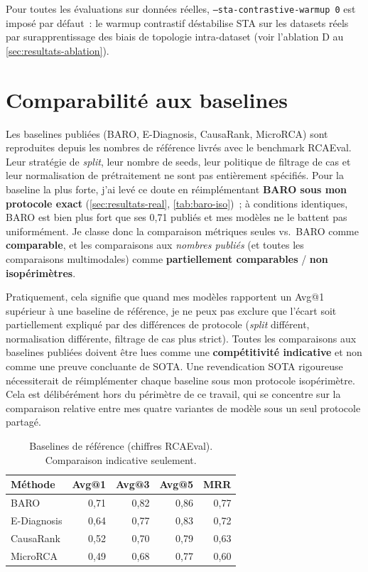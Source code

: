 \documentclass[a4paper,11pt,oneside]{report}
\begin{document}
Pour toutes les \'evaluations sur donn\'ees r\'eelles, \texttt{--sta-contrastive-warmup 0} est impos\'e par d\'efaut~: le warmup contrastif d\'estabilise STA sur les datasets r\'eels par surapprentissage des biais de topologie intra-dataset (voir l'ablation D au \cref{sec:resultats-ablation}).

\section{Comparabilit\'e aux baselines}
\label{sec:comparabilite}

Les baselines publi\'ees (BARO, E-Diagnosis, CausaRank, MicroRCA) sont reproduites depuis les nombres de r\'ef\'erence livr\'es avec le benchmark RCAEval. Leur strat\'egie de \emph{split}, leur nombre de seeds, leur politique de filtrage de cas et leur normalisation de pr\'etraitement ne sont pas enti\`erement sp\'ecifi\'es. Pour la baseline la plus forte, j'ai lev\'e ce doute en r\'eimpl\'ementant \textbf{BARO sous mon protocole exact} (\cref{sec:resultats-real}, \cref{tab:baro-iso})~; \`a conditions identiques, BARO est bien plus fort que ses 0,71 publi\'es et mes mod\`eles ne le battent pas uniform\'ement. Je classe donc la comparaison m\'etriques seules vs.\ BARO comme \textbf{comparable}, et les comparaisons aux \emph{nombres publi\'es} (et toutes les comparaisons multimodales) comme \textbf{partiellement comparables} / \textbf{non isop\'erim\`etres}.

Pratiquement, cela signifie que quand mes mod\`eles rapportent un Avg@1 sup\'erieur \`a une baseline de r\'ef\'erence, je ne peux pas exclure que l'\'ecart soit partiellement expliqu\'e par des diff\'erences de protocole (\emph{split} diff\'erent, normalisation diff\'erente, filtrage de cas plus strict). Toutes les comparaisons aux baselines publi\'ees doivent \^etre lues comme une \textbf{comp\'etitivit\'e indicative} et non comme une preuve concluante de SOTA. Une revendication SOTA rigoureuse n\'ecessiterait de r\'eimpl\'ementer chaque baseline sous mon protocole isop\'erim\`etre. Cela est d\'elib\'er\'ement hors du p\'erim\`etre de ce travail, qui se concentre sur la comparaison relative entre mes quatre variantes de mod\`ele sous un seul protocole partag\'e.

\begin{table}[ht]
\centering
\caption{Baselines de r\'ef\'erence (chiffres RCAEval). Comparaison indicative seulement.}
\label{tab:baselines-ref}
\begin{tabular}{lrrrr}
\toprule
M\'ethode & Avg@1 & Avg@3 & Avg@5 & MRR \\
\midrule
BARO & 0,71 & 0,82 & 0,86 & 0,77 \\
E-Diagnosis & 0,64 & 0,77 & 0,83 & 0,72 \\
CausaRank & 0,52 & 0,70 & 0,79 & 0,63 \\
MicroRCA & 0,49 & 0,68 & 0,77 & 0,60 \\
\bottomrule
\end{tabular}
\end{table}
\end{document}
